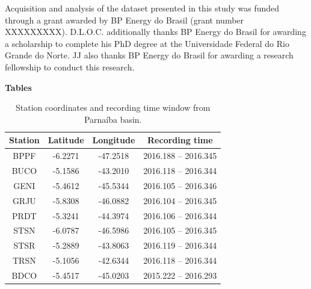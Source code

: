 \documentclass[paper,11pt]{geophysics}
\begin{document}
Acquisition and analysis of the dataset presented in this study was funded through a grant awarded by BP Energy do Brasil (grant number XXXXXXXXX). D.L.O.C. additionally thanks BP Energy do Brasil for awarding a scholarship to complete his PhD degree at the Universidade Federal do Rio Grande do Norte. JJ also thanks BP Energy do Brasil for awarding a research fellowship to conduct this research.
\linebreak
\linebreak




\pagebreak

\begin{flushleft}
\textbf{\LARGE Tables}
\end{flushleft}

\begin{table}[! htpb]
\centering
	\small
	\begin{threeparttable}
	\caption{Station coordinates and recording time window from Parnaíba basin.}
	\begin{tabular}{c c c c}
    \hline
    Station & Latitude & Longitude & Recording time \\ \hline
    BPPF & -6.2271 & -47.2518 & 2016.188 – 2016.345 \\
	BUCO & -5.1586 & -43.2010 & 2016.118 – 2016.344 \\
	GENI & -5.4612 & -45.5344 & 2016.105 – 2016.346 \\
	GRJU & -5.8308 & -46.0882 & 2016.104 – 2016.345 \\
	PRDT & -5.3241 & -44.3974 & 2016.106 – 2016.344 \\
	STSN & -6.0787 & -46.5986 & 2016.105 – 2016.345 \\
	STSR & -5.2889 & -43.8063 & 2016.119 – 2016.344 \\
	TRSN & -5.1056 & -42.6344 & 2016.118 – 2016.344 \\
	BDCO & -5.4517 & -45.0203 & 2015.222 – 2016.293 \\ \hline
    \end{tabular}
    \label{tabela_estacoes}
	\end{threeparttable}
\end{table}
\end{document}
